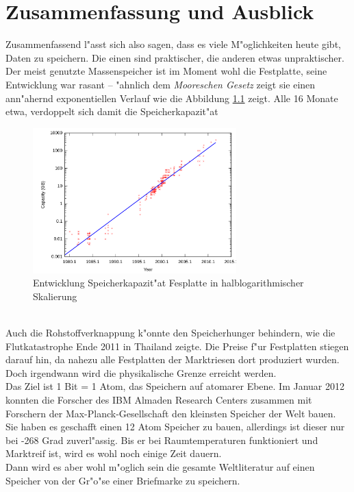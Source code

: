 
\chapter{Zusammenfassung und Ausblick}
\label{ch:Zusammenfassung}
Zusammenfassend l"asst sich also sagen, dass es viele M"oglichkeiten heute gibt, Daten zu speichern. Die einen sind praktischer, die anderen etwas unpraktischer.
Der meist genutzte Massenspeicher ist im Moment wohl die Festplatte, seine Entwicklung war rasant – "ahnlich dem \textit{Mooreschen Gesetz} zeigt sie einen ann"ahernd exponentiellen Verlauf wie die Abbildung \ref{fig:kapazit} zeigt. Alle 16 Monate etwa, verdoppelt sich damit die Speicherkapazit"at
\begin{figure}[ht]
				\centering
				\includegraphics[width=0.7\textwidth]{images/kapazit} 
				\caption[Entwicklung Speicherkapazit"at Fesplatte in halblogarithmischer Skalierung \cite{fig:kapazit}]{Entwicklung Speicherkapazit"at Fesplatte in halblogarithmischer Skalierung}
				\label{fig:kapazit}
				\end{figure}
\\
Auch die Rohstoffverknappung k"onnte den Speicherhunger behindern, wie die Flutkatastrophe Ende 2011 in Thailand zeigte. Die Preise f"ur Festplatten stiegen darauf hin, da nahezu alle Festplatten der Marktriesen dort produziert wurden.
\\
Doch irgendwann wird die physikalische Grenze erreicht werden.
\\
Das Ziel ist 1 Bit = 1 Atom, das Speichern auf atomarer Ebene. Im Januar 2012 konnten die Forscher des IBM Almaden Research Centers zusammen mit Forschern der Max-Planck-Gesellschaft den kleinsten Speicher der Welt bauen. Sie haben es geschafft einen 12 Atom Speicher zu bauen, allerdings ist dieser nur bei -268 Grad zuverl"assig. Bis er bei Raumtemperaturen funktioniert und Marktreif ist, wird es wohl noch einige Zeit dauern.\cite{heise:ibm} 
\\
Dann wird es aber wohl m"oglich sein die gesamte Weltliteratur auf einen Speicher von der Gr"o"se einer Briefmarke zu speichern. 

